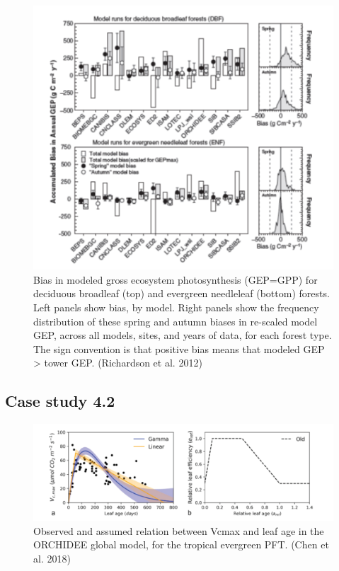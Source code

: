 \documentclass[12pt,oneside]{book}
\begin{document}
\begin{figure}

{\centering \includegraphics[width=0.8\linewidth]{figures/chap4/f48_bias_richardson} 

}

\caption{Bias in modeled gross ecosystem photosynthesis (GEP=GPP) for deciduous broadleaf (top) and evergreen needleleaf (bottom) forests. Left panels show bias, by model. Right panels show the frequency distribution of these spring and autumn biases in re-scaled model GEP, across all models, sites, and years of data, for each forest type. The sign convention is that positive bias means that modeled GEP > tower GEP. (Richardson et al. 2012)}\label{fig:f48}
\end{figure}

\subsection{Case study 4.2}\label{case-study-4.2}

\begin{figure}

{\centering \includegraphics[width=0.8\linewidth]{figures/chap4/f411_chen1} 

}

\caption{Observed and assumed relation between Vcmax and leaf age in the ORCHIDEE global model, for the tropical evergreen PFT. (Chen et al. 2018)}\label{fig:f411}
\end{figure}
\end{document}
